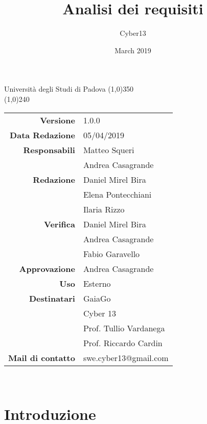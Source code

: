 \documentclass[a4paper, 12pt]{article}
\title{Analisi dei requisiti}
\author{Cyber13}
\date{March 2019}
\begin{document}
	\begin{titlepage}
		\centering Università degli Studi di Padova
		\line(1,0){350}\\
		\vspace{1.2cm}
		\logo
		\vspace{1.0cm}
		\vspace{0.5cm}
		\vspace{0.5cm}
		\line(1,0){240}\\
		\begin{tabular}{r|l}
			{\textbf{Versione}} 			& 1.0.0\\
			{\textbf{Data Redazione}} 	& 05/04/2019\\	%
			{\textbf{Responsabili}} 	& Matteo Squeri\\ & Andrea Casagrande\\	%
			{\textbf{Redazione}} 		& Daniel Mirel Bira \\ & Elena Pontecchiani\\  & Ilaria Rizzo\\
			{\textbf{Verifica}} 		& Daniel Mirel Bira \\	&  Andrea Casagrande \\ & Fabio Garavello\\ 
			{\textbf{Approvazione}} 	& Andrea Casagrande\\
			{\textbf{Uso}} 				& Esterno\\
			{\textbf{Destinatari}} & GaiaGo\\	& Cyber 13\\ & Prof. Tullio Vardanega\\ & Prof. Riccardo Cardin\\
			{\textbf{Mail di contatto}} 	& swe.cyber13@gmail.com\\
		\end{tabular}\\
	\end{titlepage}

	\newpage
		
	\newpage
		\tableofcontents
        	\newpage
	    	\listoffigures
	    	\newpage
        	\section{Introduzione}
                
                \newpage
\end{document}
